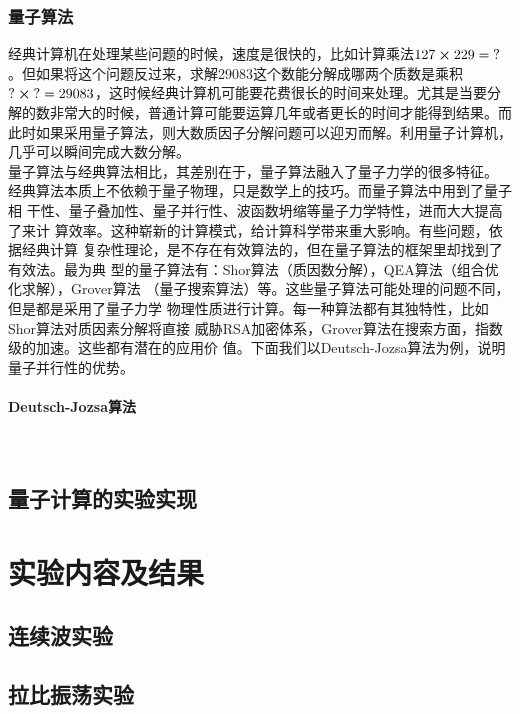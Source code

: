 \documentclass[a4paper]{article}
\begin{document}
\subsubsection{量子算法}
经典计算机在处理某些问题的时候，速度是很快的，比如计算乘法$ 127\cross 229 = \text{?} $。但如果将这个问题反过来，求解29083这个数能分解成哪两个质数是乘积$ \text{?}\cross\text{?} = 29083 $，这时候经典计算机可能要花费很长的时间来处理。尤其是当要分解的数非常大的时候，普通计算可能要运算几年或者更长的时间才能得到结果。而此时如果采用量子算法，则大数质因子分解问题可以迎刃而解。利用量子计算机，几乎可以瞬间完成大数分解。\\
量子算法与经典算法相比，其差别在于，量子算法融入了量子力学的很多特征。
经典算法本质上不依赖于量子物理，只是数学上的技巧。而量子算法中用到了量子相
干性、量子叠加性、量子并行性、波函数坍缩等量子力学特性，进而大大提高了来计
算效率。这种崭新的计算模式，给计算科学带来重大影响。有些问题，依据经典计算
复杂性理论，是不存在有效算法的，但在量子算法的框架里却找到了有效法。最为典
型的量子算法有：Shor算法（质因数分解），QEA算法（组合优化求解），Grover算法
（量子搜索算法）等。这些量子算法可能处理的问题不同，但是都是采用了量子力学
物理性质进行计算。每一种算法都有其独特性，比如Shor算法对质因素分解将直接
威胁RSA加密体系，Grover算法在搜索方面，指数级的加速。这些都有潜在的应用价
值。下面我们以Deutsch-Jozsa算法为例，说明量子并行性的优势。\\
\paragraph{Deutsch-Jozsa算法}~\\



\subsection{量子计算的实验实现}





\section{实验内容及结果}
\subsection{连续波实验}
\subsection{拉比振荡实验}
\end{document}
